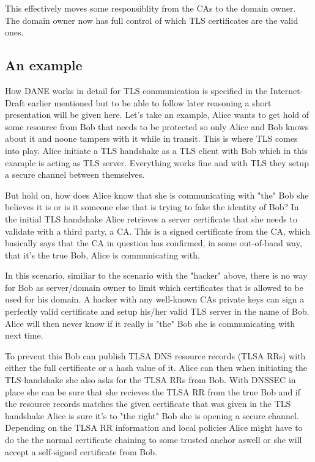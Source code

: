 This effectively moves some responsiblity from the CAs to the domain owner.
The domain owner now has full control of which TLS certificates are the valid ones.

\subsection{An example}
How DANE works in detail for TLS communication is specified in the Internet-Draft earlier mentioned\cite{rfc:draft-dane} but to be able to follow later reasoning a short presentation will be given here.
Let's take an example, Alice wants to get hold of some resource from Bob that needs to be protected so only Alice and Bob knows about it and noone tampers with it while in transit.
This is where TLS comes into play.
Alice initiate a TLS handshake as a TLS client with Bob which in this example is acting as TLS server. 
Everything works fine and with TLS they setup a secure channel between themselves.

But hold on, how does Alice know that she is communicating with "the" Bob she believes it is or is it someone else that is trying to fake the identity of Bob?
In the initial TLS handshake Alice retrieves a server certificate that she needs to validate with a third party, a CA.
This is a signed certificate from the CA, which basically says that the CA in question has confirmed, in some out-of-band way, that it's the true Bob, Alice is communicating with.

In this scenario, similiar to the scenario with the "hacker" above, there is no way for Bob as server/domain owner to limit which certificates that is allowed to be used for his domain.
A hacker with any well-known CAs private keys can sign a perfectly valid certificate and setup his/her valid TLS server in the name of Bob.
Alice will then never know if it really is "the" Bob she is communicating with next time.

To prevent this Bob can publish TLSA DNS resource records (TLSA RRs)\cite[ch. 2]{rfc:draft-dane} with either the full certificate or a hash value of it.
Alice can then when initiating the TLS handshake she also asks for the TLSA RRs from Bob.
With DNSSEC in place she can be sure that she recieves the TLSA RR from the true Bob and if the resource records matches the given certificate that was given in the TLS handshake Alice is sure it's to "the right" Bob she is opening a secure channel.
Depending on the TLSA RR information and local policies Alice might have to do the the normal certificate chaining to some trusted anchor aswell or she will accept a self-signed certificate from Bob.

